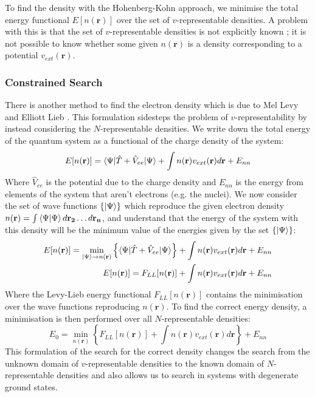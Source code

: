 \documentclass[12pt]{article}
\begin{document}
To find the density with the Hohenberg-Kohn approach, we minimise the total energy functional $E[n(\mathbf r)]$ over the set of $v$-representable densities. A problem with this is that the set of $v$-representable densities is not explicitly known \cite{GONIS201623}; it is not possible to know whether some given $n(\mathbf r)$ is a density corresponding to a potential $v_{ext}(\mathbf r)$.

\subsubsection{Constrained Search}
There is another method to find the electron density which is due to Mel Levy \cite{Levy6062} and Elliott Lieb \cite{lieb1985density}. This formulation sidesteps the problem of $v$-representability by instead considering the $N$-representable densities.
We write down the total energy of the quantum system as a functional of the charge density of the system:
\begin{equation}
	E[n(\mathbf r)] = \braket{\Psi|\hat T + \hat V_{ee}|\Psi} + \int n(\mathbf r)v_{ext}(\mathbf r)d\mathbf r + E_{nn}
\end{equation}
Where $\hat V_{ee}$ is the potential due to the charge density and $E_{nn}$ is the energy from elements of the system that aren't electrons (e.g. the nuclei). 
We now consider the set of wave functions $\left\{\ket{\Psi}\right\}$ which reproduce the given electron density $n(\mathbf r)=\int \braket{\Psi|\Psi}d\mathbf{r_2}\mathellipsis d\mathbf{r_n}$, and understand that the energy of the system with this density will be the minimum value of the energies given by the set $\left\{\ket{\Psi}\right\}$:
\begin{equation}
\begin{split}
E[n(\mathbf r)] = \min_{\ket{\Psi} \rightarrow n(\mathbf r)}\left\{\braket{\Psi | \hat T + \hat V_{ee} | \Psi}\right\} + \int n(\mathbf r) v_{ext}(\mathbf r) d \mathbf r + E_{nn}\\
E[n(\mathbf r)] = F_{LL}[n(\mathbf r)] + \int n(\mathbf r) v_{ext}(\mathbf r) d\mathbf r + E_{nn}
\end{split}
\end{equation}
Where the Levy-Lieb energy functional $F_{LL}[n(\mathbf r)]$ contains the minimisation over the wave functions reproducing $n(\mathbf r)$.
To find the correct energy density, a minimisation is then performed over all $N$-representable densities:
\begin{equation}\label{eq:levylieb}
 E_0 = \min_{n(\mathbf r)} \left\{ F_{LL}[n(\mathbf r)] + \int n(\mathbf r) v_{ext}(\mathbf r) d \mathbf r\right\} + E_{nn}
\end{equation}
This formulation of the search for the correct density changes the search from the unknown domain of $v$-representable densities to the known domain of $N$-representable densities and also allows us to search in systems with degenerate ground states. 
\end{document}
